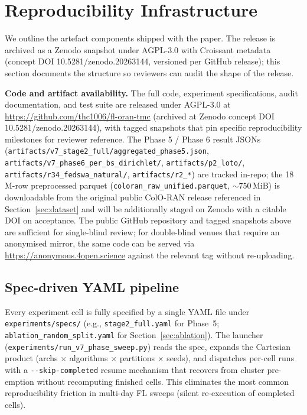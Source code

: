 \documentclass[journal]{IEEEtran}
\begin{document}
\section{Reproducibility Infrastructure}\label{sec:repro}

We outline the artefact components shipped with the paper. The release is archived as a Zenodo snapshot under AGPL-3.0 with Croissant metadata (concept DOI 10.5281/zenodo.20263144, versioned per GitHub release); this section documents the structure so reviewers can audit the shape of the release.

\textbf{Code and artifact availability.} The full code, experiment specifications, audit documentation, and test suite are released under AGPL-3.0 at \url{https://github.com/thc1006/fl-oran-tmc} (archived at Zenodo concept DOI 10.5281/zenodo.20263144), with tagged snapshots that pin specific reproducibility milestones for reviewer reference. The Phase 5 / Phase 6 result JSONs (\lstinline|artifacts/v7_stage2_full/aggregated_phase5.json|, \lstinline|artifacts/v7_phase6_per_bs_dirichlet/|, \lstinline|artifacts/p2_loto/|, \lstinline|artifacts/r34_fedswa_natural/|, \lstinline|artifacts/r2_*|) are tracked in-repo; the 18\,M-row preprocessed parquet (\lstinline|coloran_raw_unified.parquet|, $\sim 750$\,MiB) is downloadable from the original public ColO-RAN release referenced in Section~\ref{sec:dataset} and will be additionally staged on Zenodo with a citable DOI on acceptance. The public GitHub repository and tagged snapshots above are sufficient for single-blind review; for double-blind venues that require an anonymised mirror, the same code can be served via \url{https://anonymous.4open.science} against the relevant tag without re-uploading.

\subsection{Spec-driven YAML pipeline}

Every experiment cell is fully specified by a single YAML file under \lstinline|experiments/specs/| (e.g., \lstinline|stage2_full.yaml| for Phase~5; \lstinline|ablation_random_split.yaml| for Section~\ref{sec:ablation}). The launcher (\lstinline|experiments/run_v7_phase_sweep.py|) reads the spec, expands the Cartesian product (archs $\times$ algorithms $\times$ partitions $\times$ seeds), and dispatches per-cell runs with a \lstinline|--skip-completed| resume mechanism that recovers from cluster pre-emption without recomputing finished cells. This eliminates the most common reproducibility friction in multi-day FL sweeps (silent re-execution of completed cells).
\end{document}
